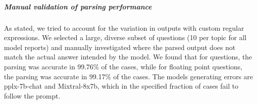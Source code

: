 \subparagraph*{Manual validation of parsing performance}

As stated, we tried to account for the variation in outputs with custom regular expressions.
We selected a large, diverse subset of questions (10 per topic for all model reports) and manually investigated where the parsed output does not match the actual answer intended by the model.
We found that for  questions, the parsing was accurate in 99.76\% of the cases, while for floating point questions, the parsing was accurate in 99.17\% of the cases.
The models generating errors are pplx-7b-chat and Mixtral-8x7b, which in the specified fraction of cases fail to follow the prompt.

